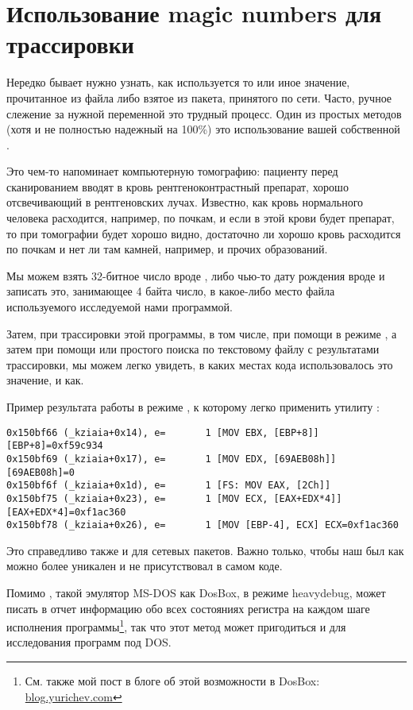 \section{Использование magic numbers для трассировки}

Нередко бывает нужно узнать, как используется то или иное значение, прочитанное из файла либо взятое из пакета,
принятого по сети. Часто, ручное слежение за нужной переменной это трудный процесс. Один из простых методов (хотя и не
полностью надежный на 100\%) это использование вашей собственной .

Это чем-то напоминает компьютерную томографию: пациенту перед сканированием вводят в кровь 
рентгеноконтрастный препарат, хорошо отсвечивающий в рентгеновских лучах.
Известно, как кровь нормального человека
расходится, например, по почкам, и если в этой крови будет препарат, то при томографии будет хорошо видно,
достаточно ли хорошо кровь расходится по почкам и нет ли там камней, например, и прочих образований.

Мы можем взять 32-битное число вроде , либо чью-то дату рождения вроде  
и записать это, занимающее 4 байта число, в какое-либо место файла используемого исследуемой нами программой.

\myindex{\GrepUsage}
Затем, при трассировки этой программы, в том числе, при помощи \tracer в режиме 
, а затем при помощи
 или простого поиска по текстовому файлу с результатами трассировки, мы можем легко увидеть, в каких местах кода использовалось 
это значение, и как.

Пример результата работы \tracer в режиме , к которому легко применить утилиту :

\begin{lstlisting}[style=customasmx86]
0x150bf66 (_kziaia+0x14), e=       1 [MOV EBX, [EBP+8]] [EBP+8]=0xf59c934 
0x150bf69 (_kziaia+0x17), e=       1 [MOV EDX, [69AEB08h]] [69AEB08h]=0 
0x150bf6f (_kziaia+0x1d), e=       1 [FS: MOV EAX, [2Ch]] 
0x150bf75 (_kziaia+0x23), e=       1 [MOV ECX, [EAX+EDX*4]] [EAX+EDX*4]=0xf1ac360 
0x150bf78 (_kziaia+0x26), e=       1 [MOV [EBP-4], ECX] ECX=0xf1ac360 
\end{lstlisting}
Это справедливо также и для сетевых пакетов.
Важно только, чтобы наш  был как можно более уникален и не присутствовал в самом коде.

\newcommand{\DOSBOXURL}{\href{http://go.yurichev.com/17222}{blog.yurichev.com}}

Помимо \tracer, такой эмулятор MS-DOS как DosBox, в режиме heavydebug, может писать в отчет информацию обо всех
состояниях регистра на каждом шаге исполнения программы\footnote{См. также мой пост в блоге об этой возможности в 
DosBox: \DOSBOXURL{}}, так что этот метод может пригодиться и для исследования программ под DOS.

